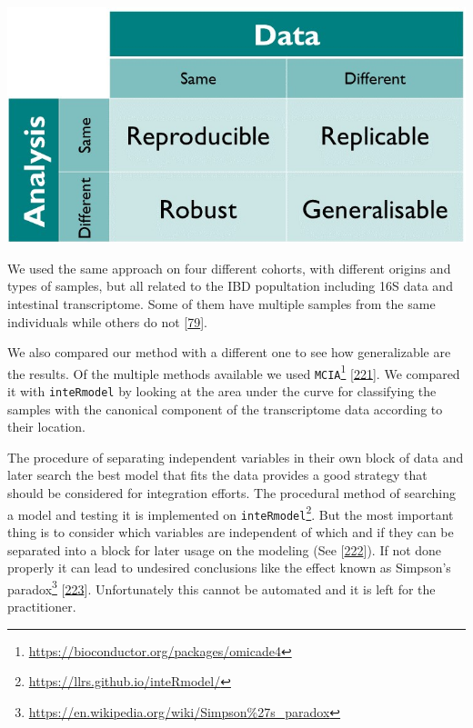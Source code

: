 \documentclass[
  12pt,
  a4paper,
  twoside,
  openright]{book}
\DeclareRobustCommand{\href}[2]{#2\footnote{\url{#1}}}
\let\origfigure\figure
\let\endorigfigure\endfigure
\renewenvironment{figure}[1][2] {
    \expandafter\origfigure\expandafter[!ht]
} {
    \endorigfigure
}
\begin{document}
\begin{figure}
\includegraphics[width=1\linewidth]{images/turing_way_reproducible-matrix} \caption[Reproducibility matrix]{Reproducibility matrix indicating the terminology used between using the same method and the same data. Figure from The Turing Way: A Handbook for Reproducible Data Science (Version v1.0.1).}\label{fig:reproducible-matrix}
\end{figure}

We used the same approach on four different cohorts, with different origins and types of samples, but all related to the IBD popultation including 16S data and intestinal transcriptome.
Some of them have multiple samples from the same individuals while others do not {[}\protect\hyperlink{ref-hasler_uncoupling_2016}{79}{]}.

We also compared our method with a different one to see how generalizable are the results.
Of the multiple methods available we used \href{https://bioconductor.org/packages/omicade4}{\texttt{MCIA}} {[}\protect\hyperlink{ref-mengMultivariateApproachIntegration2014}{221}{]}.
We compared it with \texttt{inteRmodel} by looking at the area under the curve for classifying the samples with the canonical component of the transcriptome data according to their location.

The procedure of separating independent variables in their own block of data and later search the best model that fits the data provides a good strategy that should be considered for integration efforts.
The procedural method of searching a model and testing it is implemented on \href{https://llrs.github.io/inteRmodel/}{\texttt{inteRmodel}}.
But the most important thing is to consider which variables are independent of which and if they can be separated into a block for later usage on the modeling (See {[}\protect\hyperlink{ref-pearl2011}{222}{]}).
If not done properly it can lead to undesired conclusions like the effect known as \href{https://en.wikipedia.org/wiki/Simpson\%27s_paradox}{Simpson's paradox} {[}\protect\hyperlink{ref-simpson1951}{223}{]}.
Unfortunately this cannot be automated and it is left for the practitioner.
\end{document}
